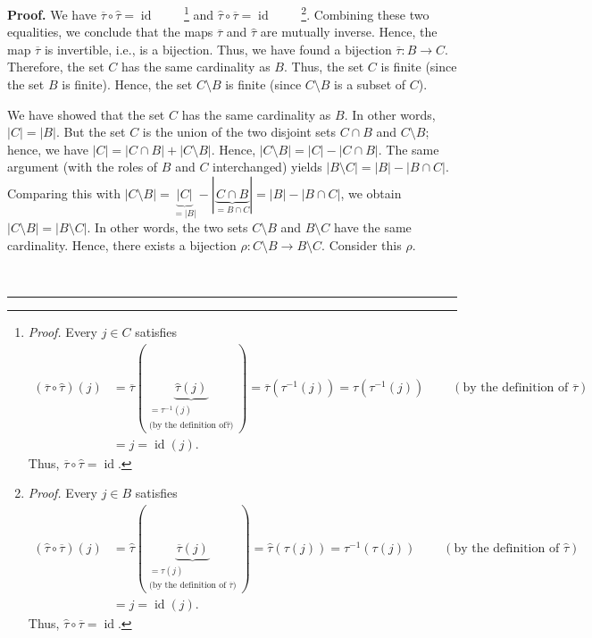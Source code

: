 \documentclass[numbers=enddot,12pt,final,onecolumn,notitlepage]{scrartcl}%
\theoremstyle{definition}
\newenvironment{proof}[1][Proof]{\noindent\textbf{#1.} }{\ \rule{0.5em}{0.5em}}
\newenvironment{verlong}{}{}
\begin{document}
\begin{verlong}
\begin{proof}
We have $\overline{\tau}\circ\widehat{\tau}=\operatorname*{id}$%
\ \ \ \ \footnote{\textit{Proof.} Every $j\in C$ satisfies%
\begin{align*}
\left(  \overline{\tau}\circ\widehat{\tau}\right)  \left(  j\right)   &
=\overline{\tau}\left(  \underbrace{\widehat{\tau}\left(  j\right)
}_{\substack{=\tau^{-1}\left(  j\right)  \\\text{(by the definition of
}\widehat{\tau}\text{)}}}\right)  =\overline{\tau}\left(  \tau^{-1}\left(
j\right)  \right)  =\tau\left(  \tau^{-1}\left(  j\right)  \right)
\ \ \ \ \ \ \ \ \ \ \left(  \text{by the definition of }\overline{\tau}\right)
\\
&  =j=\operatorname*{id}\left(  j\right)  .
\end{align*}
Thus, $\overline{\tau}\circ\widehat{\tau}=\operatorname*{id}$.} and
$\widehat{\tau}\circ\overline{\tau}=\operatorname*{id}$%
\ \ \ \ \footnote{\textit{Proof.} Every $j\in B$ satisfies%
\begin{align*}
\left(  \widehat{\tau}\circ\overline{\tau}\right)  \left(  j\right)   &
=\widehat{\tau}\left(  \underbrace{\overline{\tau}\left(  j\right)
}_{\substack{=\tau\left(  j\right)  \\\text{(by the definition of }%
\overline{\tau}\text{)}}}\right)  =\widehat{\tau}\left(  \tau\left(  j\right)
\right)  =\tau^{-1}\left(  \tau\left(  j\right)  \right)
\ \ \ \ \ \ \ \ \ \ \left(  \text{by the definition of }\widehat{\tau}\right)
\\
&  =j=\operatorname*{id}\left(  j\right)  .
\end{align*}
Thus, $\widehat{\tau}\circ\overline{\tau}=\operatorname*{id}$.}. Combining
these two equalities, we conclude that the maps $\overline{\tau}$ and
$\widehat{\tau}$ are mutually inverse. Hence, the map $\overline{\tau}$ is
invertible, i.e., is a bijection. Thus, we have found a bijection
$\overline{\tau}:B\rightarrow C$. Therefore, the set $C$ has the same
cardinality as $B$. Thus, the set $C$ is finite (since the set $B$ is finite).
Hence, the set $C\setminus B$ is finite (since $C\setminus B$ is a subset of
$C$).

We have showed that the set $C$ has the same cardinality as $B$. In other
words, $\left\vert C\right\vert =\left\vert B\right\vert $. But the set $C$ is
the union of the two disjoint sets $C\cap B$ and $C\setminus B$; hence, we
have $\left\vert C\right\vert =\left\vert C\cap B\right\vert +\left\vert
C\setminus B\right\vert $. Hence, $\left\vert C\setminus B\right\vert
=\left\vert C\right\vert -\left\vert C\cap B\right\vert $. The same argument
(with the roles of $B$ and $C$ interchanged) yields $\left\vert B\setminus
C\right\vert =\left\vert B\right\vert -\left\vert B\cap C\right\vert $.
Comparing this with $\left\vert C\setminus B\right\vert
=\underbrace{\left\vert C\right\vert }_{=\left\vert B\right\vert }-\left\vert
\underbrace{C\cap B}_{=B\cap C}\right\vert =\left\vert B\right\vert
-\left\vert B\cap C\right\vert $, we obtain $\left\vert C\setminus
B\right\vert =\left\vert B\setminus C\right\vert $. In other words, the two
sets $C\setminus B$ and $B\setminus C$ have the same cardinality. Hence, there
exists a bijection $\rho:C\setminus B\rightarrow B\setminus C$. Consider this
$\rho$.


\end{proof}
\end{verlong}
\end{document}
